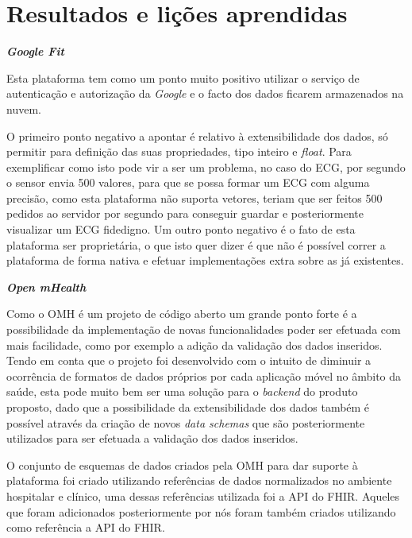 \section{Resultados e lições aprendidas}

\textbf{\textit{Google Fit}}
\par
Esta plataforma tem como um ponto muito positivo utilizar o serviço de autenticação e autorização da \textit{Google} e o facto dos dados ficarem armazenados na nuvem.\par 
O primeiro ponto negativo a apontar é relativo à extensibilidade dos dados, só permitir para definição das suas propriedades, tipo inteiro e \textit{float}. Para exemplificar como isto pode vir a ser um problema, no caso do \gls{ECG}, por segundo o sensor envia 500 valores, para que se possa formar um \gls{ECG} com alguma precisão, como esta plataforma não suporta vetores, teriam que ser feitos 500 pedidos ao servidor por segundo para conseguir guardar e posteriormente visualizar um \gls{ECG} fidedigno. Um outro ponto negativo é o fato de esta plataforma ser proprietária, o que isto quer dizer é que não é possível correr a plataforma de forma nativa e efetuar implementações extra sobre as já existentes.
\par
\textbf{\textit{Open mHealth}}
\par
Como o \gls{OMH} é um projeto de código aberto um grande ponto forte é a possibilidade da implementação de novas funcionalidades poder ser efetuada com mais facilidade, como por exemplo a adição da validação dos dados inseridos. Tendo em conta que o projeto foi desenvolvido com o intuito de diminuir a ocorrência de formatos de dados próprios por cada aplicação móvel no âmbito da saúde, esta pode muito bem ser uma solução para o \textit{backend} do produto proposto, dado que a possibilidade da extensibilidade dos dados também é possível através da criação de novos \textit{data schemas} que são posteriormente utilizados para ser efetuada a validação dos dados inseridos.
\par
O conjunto de esquemas de dados criados pela \gls{OMH} para dar suporte à plataforma foi criado utilizando referências de dados normalizados no ambiente hospitalar e clínico, uma dessas referências utilizada foi a \gls{API} do \gls{FHIR}. Aqueles que foram adicionados posteriormente por nós foram também criados utilizando como referência a \gls{API} do \gls{FHIR}.
\par
